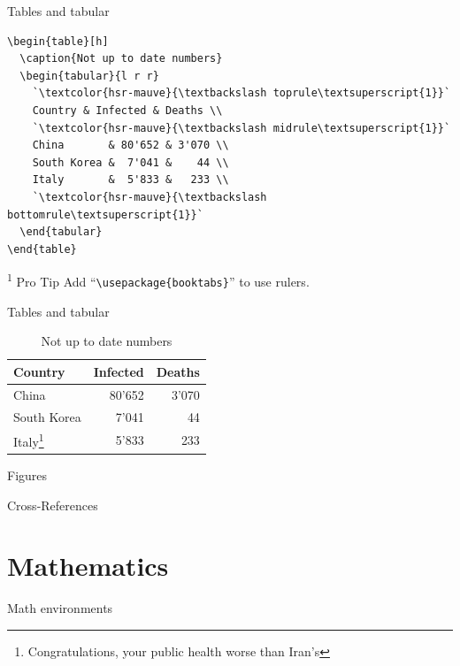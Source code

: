 \documentclass[xetex, onlymath]{beamer}
\begin{document}
\begin{frame}[fragile]{Tables and tabular}
\begin{lstlisting}
\begin{table}[h]
  \caption{Not up to date numbers}
  \begin{tabular}{l r r}
    `\textcolor{hsr-mauve}{\textbackslash toprule\textsuperscript{1}}`
    Country & Infected & Deaths \\
    `\textcolor{hsr-mauve}{\textbackslash midrule\textsuperscript{1}}`
    China       & 80'652 & 3'070 \\
    South Korea &  7'041 &    44 \\
    Italy       &  5'833 &   233 \\
    `\textcolor{hsr-mauve}{\textbackslash bottomrule\textsuperscript{1}}`
  \end{tabular}
\end{table}
\end{lstlisting}
\begin{alertblock}{\textsuperscript{1} Pro Tip}
	Add ``\texttt{\textbackslash usepackage\{booktabs\}}'' to use
	rulers.
\end{alertblock}
\end{frame}

\begin{frame}{Tables and tabular}
\begin{exampleblock}{}
\begin{table}
  \caption{Not up to date numbers}
  \begin{tabular}{l r r}
    \toprule
    Country & Infected & Deaths \\
    \midrule
    China       & 80'652 & 3'070 \\
    South Korea &  7'041 &    44 \\
    Italy\footnote{Congratulations, your public health worse than Iran's}
    &  5'833 &   233 \\
    \bottomrule
  \end{tabular}
\end{table}
\end{exampleblock}
\end{frame}


\begin{frame}{Figures}
\end{frame}

\begin{frame}{Cross-References}
\end{frame}

\section{Mathematics}
\begin{frame}{Math environments}
\end{frame}
\end{document}
